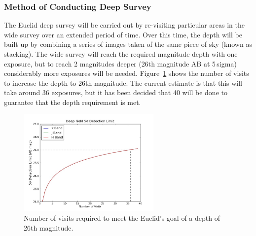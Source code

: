 	\subsubsection{Method of Conducting Deep Survey} %
	\label{ssub:method_of_conducting_deep_survey}
		The Euclid deep survey will be carried out by re-visiting particular areas in the wide survey over an extended period of time. Over this time, the depth will be built up by combining a series of images taken of the same piece of sky (known as stacking). The wide survey will reach the required magnitude depth with one exposure, but to reach 2 magnitudes deeper (26th magnitude AB at 5\,sigma) considerably more exposures will be needed. Figure~\ref{fig:euclid_visits_magnitude} shows the number of visits to increase the depth to 26th magnitude. The current estimate is that this will take around 36 exposures, but it has been decided that 40 will be done to guarantee that the depth requirement is met\cite{NISP_Performance_Analysis_ReportEUCL}.
		\begin{figure}[htbp]
			\begin{center}
				\includegraphics[width=0.62\textwidth]{../Images/Euclid_visits_magnitude.jpg}
			\end{center}
			\caption{Number of visits required to meet the Euclid's goal of a depth of 26th magnitude.\label{fig:euclid_visits_magnitude}}
		\end{figure}

